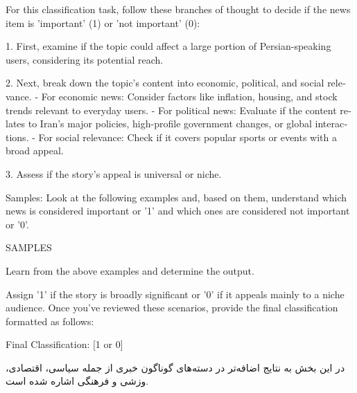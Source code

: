 \vspace{5pt}
\begin{scriptsize}
\begin{itshape}
\begin{latin}
\LTR
For this classification task, follow these branches of thought to decide if the news item is 'important' (1) or 'not important' (0):

1. First, examine if the topic could affect a large portion of Persian-speaking users, considering its potential reach.

2. Next, break down the topic's content into economic, political, and social relevance.
   - For economic news: Consider factors like inflation, housing, and stock trends relevant to everyday users.
   - For political news: Evaluate if the content relates to Iran’s major policies, high-profile government changes, or global interactions.
   - For social relevance: Check if it covers popular sports or events with a broad appeal.

3. Assess if the story’s appeal is universal or niche.

Samples: Look at the following examples and, based on them, understand which news is considered important or '1' and which ones are considered not important or '0'.

SAMPLES

Learn from the above examples and determine the output.

Assign '1' if the story is broadly significant or '0' if it appeals mainly to a niche audience. Once you’ve reviewed these scenarios, provide the final classification formatted as follows:

Final Classification: [1 or 0]
\RTL
\end{latin}
\end{itshape}
\end{scriptsize}
\vspace{5pt}


در این بخش به نتایج اضافه‌تر در دسته‌های گوناگون خبری از جمله سیاسی، اقتصادی، وزشی و فرهنگی اشاره شده است.